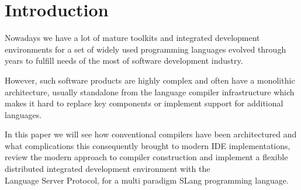 \chapter{Introduction}
\label{chap:intro}

Nowadays we have a lot of mature toolkits and integrated development environments for a set of widely used programming languages
evolved through years to fulfill needs of the most of software development industry.

However, such software products are highly complex and often have a monolithic architecture, usually standalone 
from the language compiler infrastructure which makes it hard to replace key components or implement support for additional languages.

In this paper we will see how conventional compilers have been architectured and what complications 
this consequently brought to modern IDE implementations, review the modern approach to compiler construction and implement a flexible 
distributed integrated development environment with the \\Language Server Protocol, for a multi paradigm SLang\cite{Zouev2017} programming language. 